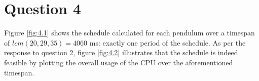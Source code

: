 \section{Question 4}

Figure \ref{fig:4.1} shows the schedule calculated for each pendulum over a
timespan of $lcm(20,29,35) = 4060$ ms: exactly one period of the schedule.
As per the response to question 2, figure \ref{fig:4.2} illustrates that the
schedule is indeed feasible by plotting the overall usage of the CPU over the
aforementioned timespan.


\noindent{}
